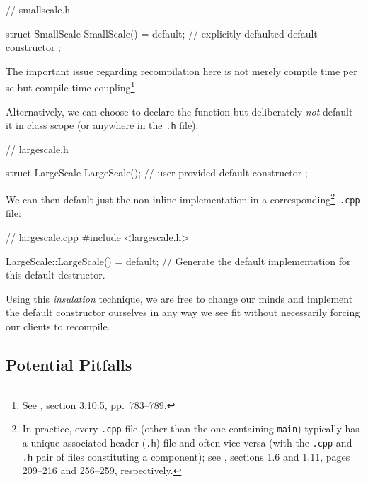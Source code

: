 \begin{emcppslisting}[language=C++]
// smallscale.h

struct SmallScale
{
    SmallScale() = default;  // explicitly defaulted default constructor
};
\end{emcppslisting}
    
\noindent The important issue regarding recompilation here is not merely compile time per se but compile-time coupling{\cprotect\footnote{See
  \cite{lakos20}, section 3.10.5, pp.~783--789.}}

Alternatively, we can choose to declare the function but deliberately
\emph{not} default it in class scope (or anywhere in the \lstinline!.h!
file):

\begin{emcppslisting}[language=C++]
// largescale.h

struct LargeScale
{
    LargeScale();  // user-provided default constructor
};
\end{emcppslisting}
    
\noindent We can then default just the non-inline implementation in a
corresponding{\cprotect\footnote{In practice, every \lstinline!.cpp! file
(other than the one containing \lstinline!main!) typically has a unique
associated header (\lstinline!.h!) file and often vice versa  (with the \lstinline!.cpp! and \lstinline!.h! pair of files constituting a component); see \cite{lakos20}, sections 1.6 and 1.11,
  pages 209--216 and 256--259, respectively.}}~\lstinline!.cpp! file:

\begin{emcppslisting}[language=C++]
// largescale.cpp
#include <largescale.h>

LargeScale::LargeScale() = default;
    // Generate the default implementation for this default destructor.
\end{emcppslisting}
    
\noindent Using this \emph{insulation} technique, we are free to change our minds
and implement the default constructor ourselves in any way we see fit
without necessarily forcing our clients to recompile.

\subsection[Potential Pitfalls]{Potential Pitfalls}\label{potential-pitfalls}

